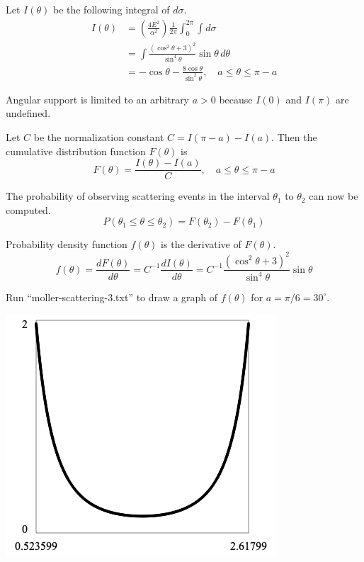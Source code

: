 \documentclass[12pt]{article}
\begin{document}
\noindent
Let $I(\theta)$ be the following integral of $d\sigma$.
\begin{align*}
I(\theta)&=\left(\frac{4E^2}{\alpha^2}\right)\frac{1}{2\pi}\int_0^{2\pi}\int d\sigma
\\
&=\int\frac{\left(\cos^2\theta+3\right)^2}{\sin^4\theta}\sin\theta\,d\theta
\\
&=-\cos\theta-\frac{8\cos\theta}{\sin^2\theta},
\quad a\le\theta\le\pi-a
\end{align*}

\noindent
Angular support is limited to an arbitrary $a>0$ because $I(0)$ and $I(\pi)$ are undefined.

\bigskip
\noindent
Let $C$ be the normalization constant $C=I(\pi-a)-I(a)$.
Then the cumulative distribution function $F(\theta)$ is
\begin{equation*}
F(\theta)=\frac{I(\theta)-I(a)}{C},\quad a\le\theta\le\pi-a
\end{equation*}

\noindent
The probability of observing scattering events in the interval $\theta_1$ to $\theta_2$
can now be computed.
\begin{equation*}
P(\theta_1\le\theta\le\theta_2)=F(\theta_2)-F(\theta_1)
\end{equation*}

\noindent
Probability density function $f(\theta)$ is the derivative of $F(\theta)$.
\begin{equation*}
f(\theta)=\frac{dF(\theta)}{d\theta}
=C^{-1}\frac{dI(\theta)}{d\theta}
=C^{-1}\frac{\left(\cos^2\theta+3\right)^2}{\sin^4\theta}\sin\theta
\end{equation*}

\noindent
Run ``moller-scattering-3.txt'' to draw a graph of $f(\theta)$ for $a=\pi/6=30^\circ$.

\begin{center}
\includegraphics[scale=0.5]{moller-scattering.png}
\end{center}
\end{document}
